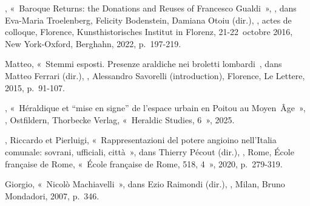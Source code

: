 \begin{teiElement}[name={TEI},change={commons\_edition}]
\begin{teiElement}[name={text},type={book},xmlid={book}]
\begin{teiElement}[name={group},type={book},xmlid={book-001}]
\begin{teiElement}[name={group},type={bibliography},data-page-title={Sources et bibliographie},data-include-href={Ch14\_Source\_bibliographie.xml},xmlid={bibliography-001}]
\begin{teiElement}[name={body}]
\begin{teiDiv}[type={section1},xmlid={div18}]
\begin{teiDiv}[type={section2},xmlid={div19}]
\begin{teiBibl}[xmlid={bibl-369}]
, « Baroque Returns: the Donations and Reuses of Francesco Gualdi », , dans Eva-Maria Troelenberg, Felicity Bodenstein, Damiana Otoiu (dir.), , actes de colloque, Florence, Kunsthistorisches Institut in Florenz, 21-22 octobre 2016, New York-Oxford, Berghahn, 2022, p. 197-219.
\end{teiBibl}
              \begin{teiBibl}[xmlid={bibl-370}]
 Matteo, « Stemmi esposti. Presenze araldiche nei broletti lombardi , dans Matteo Ferrari (dir.), , Alessandro Savorelli (introduction), Florence, Le Lettere, 2015, p. 91-107.
\end{teiBibl}
              \begin{teiBibl}[xmlid={bibl-371}]
, « Héraldique et “mise en signe” de l’espace urbain en Poitou au Moyen Âge », , Ostfildern, Thorbecke Verlag, « Heraldic Studies, 6 », 2025.
\end{teiBibl}
              \begin{teiBibl}[xmlid={bibl-372}]
,  Riccardo et  Pierluigi, « Rappresentazioni del potere angioino nell’Italia comunale: sovrani, ufficiali, città », dans Thierry Pécout (dir.), \teiHi[rend={italic}]{-}, Rome, École française de Rome, « École française de Rome, 518, 4 », 2020, p. 279-319.
\end{teiBibl}
              \begin{teiBibl}[xmlid={bibl-373}]
 Giorgio, « Nicolò Machiavelli », dans Ezio Raimondi (dir.), , Milan, Bruno Mondadori, 2007, p. 346.
\end{teiBibl}
              \begin{teiBibl}[xmlid={bibl-374}]

\end{teiBibl}
\end{teiDiv}
\end{teiDiv}
\end{teiElement}
\end{teiElement}
\end{teiElement}
\end{teiElement}
\end{teiElement}
